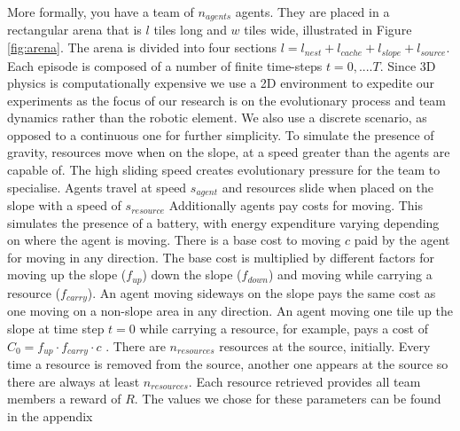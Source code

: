 \documentclass[12pt]{article}  %
\begin{document}
More formally, you have a team of $n_{agents}$ agents. 
They are placed in a rectangular arena that is $l$ tiles long and $w$ tiles wide, illustrated in Figure \ref{fig:arena}. 
The arena is divided into four sections $l= l_{nest} + l_{cache} + l_{slope} + l_{source}$.
Each episode is composed of a number of finite time-steps $t=0, .... T$. 
Since 3D physics is computationally expensive we use a 2D environment to expedite our experiments as the focus of our research is on the evolutionary process and team dynamics rather than the robotic element.
We also use a discrete scenario, as opposed to a continuous one for further simplicity.
To simulate the presence of gravity, resources move when on the slope, at a speed greater than the agents are capable of.
The high sliding speed creates evolutionary pressure for the team to specialise.
Agents travel at speed $s_{agent}$ and resources slide when placed on the slope with a speed of $s_{resource}$ 
Additionally agents pay costs for moving.
This simulates the presence of a battery, with energy expenditure varying depending on where the agent is moving.
There is a base cost to moving $c$ paid by the agent for moving in any direction.
The base cost is multiplied by different factors for moving up the slope ($f_{up}$) down the slope ($f_{down}$) and moving while carrying a resource ($f_{carry}$). 
An agent moving sideways on the slope pays the same cost as one moving on a non-slope area in any direction.
An agent moving one tile up the slope at time step $t=0$ while carrying a resource, for example, pays a cost of $C_{0} = f_{up} \cdot f_{carry} \cdot c$ .
There are $n_{resources}$ resources at the source, initially.
Every time a resource is removed from the source, another one appears at the source so there are always at least $n_{resources}$.
Each resource retrieved provides all team members a reward of $R$.
The values we chose for these parameters can be found in the appendix\\
\end{document}
